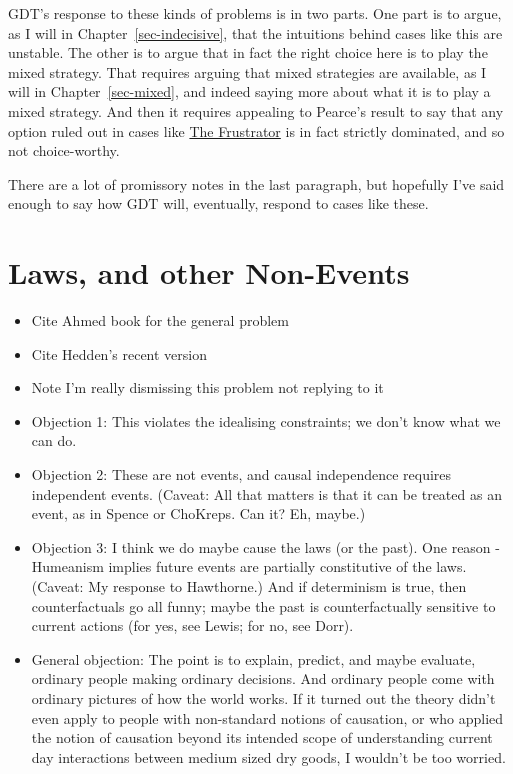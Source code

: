 \documentclass[
  12pt,
  letterpaper,
  DIV=11,
  numbers=noendperiod]{scrreprt}
\providecommand{\tightlist}{%
  \setlength{\itemsep}{0pt}\setlength{\parskip}{0pt}}\usepackage{longtable,booktabs,array}
\begin{document}
GDT's response to these kinds of problems is in two parts. One part is
to argue, as I will in Chapter~\ref{sec-indecisive}, that the intuitions
behind cases like this are unstable. The other is to argue that in fact
the right choice here is to play the mixed strategy. That requires
arguing that mixed strategies are available, as I will in
Chapter~\ref{sec-mixed}, and indeed saying more about what it is to play
a mixed strategy. And then it requires appealing to Pearce's result to
say that any option ruled out in cases like
\hyperref[tbl-frustrator]{The Frustrator} is in fact strictly dominated,
and so not choice-worthy.

There are a lot of promissory notes in the last paragraph, but hopefully
I've said enough to say how GDT will, eventually, respond to cases like
these.

\section{Laws, and other Non-Events}\label{laws-and-other-non-events}

\begin{itemize}
\tightlist
\item
  Cite Ahmed book for the general problem
\item
  Cite Hedden's recent version
\item
  Note I'm really dismissing this problem not replying to it
\item
  Objection 1: This violates the idealising constraints; we don't know
  what we can do.
\item
  Objection 2: These are not events, and causal independence requires
  independent events. (Caveat: All that matters is that it can be
  treated as an event, as in Spence or ChoKreps. Can it? Eh, maybe.)
\item
  Objection 3: I think we do maybe cause the laws (or the past). One
  reason - Humeanism implies future events are partially constitutive of
  the laws. (Caveat: My response to Hawthorne.) And if determinism is
  true, then counterfactuals go all funny; maybe the past is
  counterfactually sensitive to current actions (for yes, see Lewis; for
  no, see Dorr).
\item
  General objection: The point is to explain, predict, and maybe
  evaluate, ordinary people making ordinary decisions. And ordinary
  people come with ordinary pictures of how the world works. If it
  turned out the theory didn't even apply to people with non-standard
  notions of causation, or who applied the notion of causation beyond
  its intended scope of understanding current day interactions between
  medium sized dry goods, I wouldn't be too worried.
\end{itemize}
\end{document}
